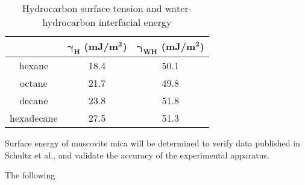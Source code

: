 \begin{table}[h!]
\centering
\caption{Hydrocarbon surface tension and water-hydrocarbon interfacial energy}
\begin{tabular} { |c||c|c|  } %
	\hline
	\textbf{\nalk[s]}	&\textbf{$\bm{\gamma_{H}}$ (mJ/m$\bm{^{2}}$)}	&\textbf{$\bm{\gamma_{WH}}$ (mJ/m$\bm{^{2}}$)}	\\
	\hline
	hexane		&18.4	&50.1 \\
	\hline
	octane		&21.7	&49.8 \\
	\hline
	decane		&23.8	&51.8 \\
	\hline
	hexadecane	&27.5	&51.3 \\
	\hline
\end{tabular}
\label{knownsurften}
\end{table}

Surface energy of muscovite mica will be determined to verify data published in Schultz et al.\cite{Schultz1977,Schultz1992}, and validate the accuracy of the experimental apparatus. 

The following 

